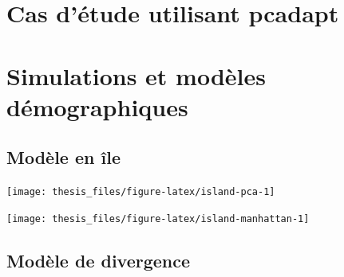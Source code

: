 \documentclass[12pt,twoside]{ugathesis}
\begin{document}
\section{Cas d'étude utilisant
pcadapt}\label{cas-detude-utilisant-pcadapt}

\section{Simulations et modèles
démographiques}\label{simulations-et-modeles-demographiques}

\subsection{Modèle en île}\label{modele-en-ile}
\begin{center}\texttt{[image: thesis\_files/figure-latex/island-pca-1]} \end{center}
\begin{center}\texttt{[image: thesis\_files/figure-latex/island-manhattan-1]} \end{center}

\subsection{Modèle de divergence}\label{modele-de-divergence}
\end{document}
